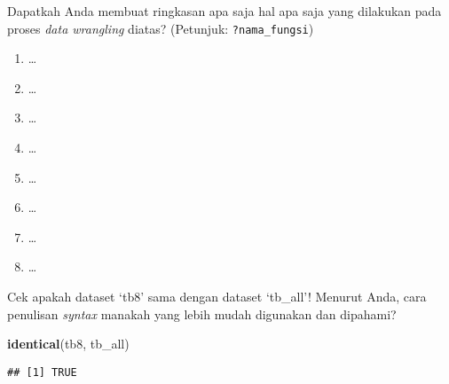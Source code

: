\documentclass[]{article}
\newenvironment{Shaded}{\begin{snugshade}}{\end{snugshade}}
\newcommand{\KeywordTok}[1]{\textcolor[rgb]{0.13,0.29,0.53}{\textbf{#1}}}
\newcommand{\NormalTok}[1]{#1}
\providecommand{\tightlist}{%
  \setlength{\itemsep}{0pt}\setlength{\parskip}{0pt}}
\begin{document}
Dapatkah Anda membuat ringkasan apa saja hal apa saja yang dilakukan
pada proses \emph{data wrangling} diatas? (Petunjuk:
\texttt{?nama\_fungsi})

\begin{enumerate}
\def\labelenumi{\arabic{enumi}.}
\tightlist
\item
  \ldots{}
\item
  \ldots{}
\item
  \ldots{}
\item
  \ldots{}
\item
  \ldots{}
\item
  \ldots{}
\item
  \ldots{}
\item
  \ldots{}
\end{enumerate}

Cek apakah dataset `tb8' sama dengan dataset `tb\_all'! Menurut Anda,
cara penulisan \emph{syntax} manakah yang lebih mudah digunakan dan
dipahami?

\begin{Shaded}
\begin{Highlighting}[]
\KeywordTok{identical}\NormalTok{(tb8, tb_all)}
\end{Highlighting}
\end{Shaded}

\begin{verbatim}
## [1] TRUE
\end{verbatim}
\end{document}
